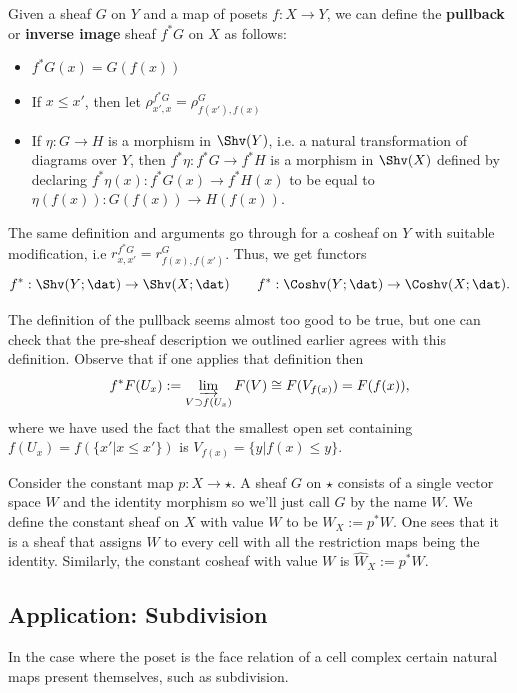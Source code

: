 \begin{defn}
	Given a sheaf $G$ on $Y$ and a map of posets $f:X\to Y$, we can define the \textbf{pullback} or \textbf{inverse image} sheaf $f^*G$ on $X$ as follows:
	\begin{itemize}
		\item $f^*G(x)=G(f(x))$
		\item If $x\leq x'$, then let $\rho^{f^*G}_{x',x}=\rho^G_{f(x'),f(x)}$
		\item If $\eta: G\to H$ is a morphism in $\Shv(Y)$, i.e. a natural transformation of diagrams over $Y$, then $f^*\eta: f^*G\to f^*H$ is a morphism in $\Shv(X)$ defined by declaring $f^*\eta(x):f^*G(x)\to f^*H(x)$ to be equal to $\eta(f(x)):G(f(x))\to H(f(x))$.
	\end{itemize}
	
	The same definition and arguments go through for a cosheaf on $Y$ with suitable modification, i.e $r^{f^*G}_{x,x'}=r^G_{f(x),f(x')}$. Thus, we get functors
	\[
	f^*:\Shv(Y;\dat) \to \Shv(X;\dat) \qquad f^*:\Coshv(Y;\dat)\to\Coshv(X;\dat).
	\] 
\end{defn}

The definition of the pullback seems almost too good to be true, but one can check that the pre-sheaf description we outlined earlier agrees with this definition. Observe that if one applies that definition then
\[
	f^*F(U_x):=\varinjlim_{V \supset f(U_x)} F(V) \cong F(V_{f(x)})=F(f(x)),
\]
where we have used the fact that the smallest open set containing $f(U_x)=f(\{x' | x\leq x'\})$ is $V_{f(x)}=\{y|f(x)\leq y\}$.

\begin{ex}
 Consider the constant map $p:X\to\star$. A sheaf $G$ on $\star$ consists of a single vector space $W$ and the identity morphism so we'll just call $G$ by the name $W$. We define the constant sheaf on $X$ with value $W$ to be $W_X:=p^*W$. One sees that it is a sheaf that assigns $W$ to every cell with all the restriction maps being the identity. Similarly, the constant cosheaf with value $W$ is $\hat{W}_X:=p^* W$.
\end{ex}

\subsection{Application: Subdivision}
\label{subsubsec:subdivide}
In the case where the poset is the face relation of a cell complex certain natural maps present themselves, such as subdivision.
	

